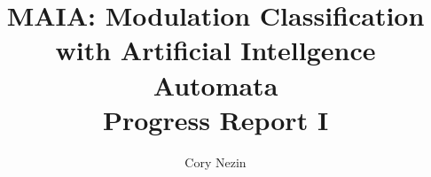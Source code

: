 \documentclass[12pt]{article}
\begin{document}
\title{MAIA: Modulation Classification with Artificial Intellgence Automata \\ Progress Report I}
\author{Cory Nezin}
\maketitle




\end{document}
